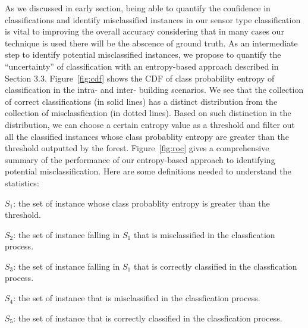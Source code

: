 As we discussed in early section, being able to quantify the confidence in classifications and identify misclassified instances in our sensor type classification is vital to improving 
the overall accuracy considering that in many cases our technique is used there will be the abscence of ground truth. As an intermediate step to identify potential misclassified instances, 
we propose to quantify the ``uncertainty'' of classification with an entropy-based approach described in Section 3.3. Figure~\ref{fig:cdf} shows the CDF of class probability entropy of 
classification in the intra- and inter- building scenarios. We see that the collection of correct classifications (in solid lines) has a distinct distribution from the collection of 
misclassfication (in dotted lines). Based on such distinction in the distribution, we can choose a certain entropy value as a threshold and filter out all the classified instances whose 
class probablity entropy are greater than the threshold outputted by the forest. Figure~\ref{fig:roc} gives a comprehensive summary of the performance of our entropy-based approach to 
identifying potential misclassification. Here are some definitions needed to understand the statistics:

$S_{1}$: the set of instance whose class probablity entropy is greater than the threshold.

$S_{2}$: the set of instance falling in $S_{1}$ that is misclassified in the classfication process.

$S_{3}$: the set of instance falling in $S_{1}$ that is correctly classified in the classfication process.

$S_{4}$: the set of instance that is misclassified in the classfication process.

$S_{5}$: the set of instance that is correctly classified in the classfication process.

